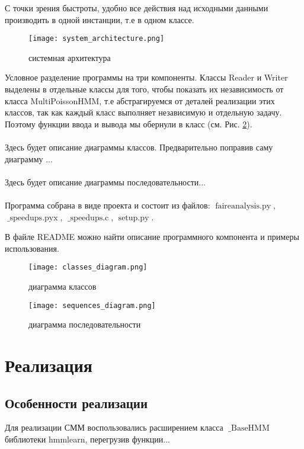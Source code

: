 \documentclass{matmex-diploma-custom}
\begin{document}
С точки зрения быстроты, удобно все действия над исходными данными производить в одной инстанции, т.е в одном классе.

\begin{figure}[h]
\centering
\texttt{[image: system\_architecture.png]}
\caption{системная архитектура}
\label{fig:system_architecture}
\end{figure}

Условное разделение программы на три компоненты. Классы Reader и Writer выделены в отдельные классы для того, чтобы показать их независимость от класса MultiPoissonHMM, т.е абстрагируемся от деталей реализации этих классов, так как каждый класс выполняет независимую и отдельную задачу. Поэтому функции ввода и вывода мы обернули в класс (см. Рис. \ref{fig:classes_diagram}). 
\\\\
Здесь будет описание диаграммы классов. Предварительно поправив саму диаграмму ...
\\\\
Здесь будет описание диаграммы последовательности...
\\\\
Программа собрана в виде проекта и состоит из файлов: 
$\operatorname{faireanalysis.py}$, 
$\operatorname{\_speedups.pyx}$, 
$\operatorname{\_speedups.c}$, 
$\operatorname{setup.py}$. 

В файле README можно найти описание программного компонента и примеры использования.

\begin{figure}
\centering
\texttt{[image: classes\_diagram.png]}
\caption{диаграмма классов}
\label{fig:classes_diagram}
\end{figure}

\begin{figure}
\label{sequences_diagram}
\centering
\texttt{[image: sequences\_diagram.png]}
\caption{диаграмма последовательности}
\end{figure}

\section{Реализация}
\subsection{Особенности реализации}
Для реализации СММ воспользовались расширением класса $\operatorname{\_BaseHMM}$ библиотеки hmmlearn, перегрузив функции...
\end{document}

